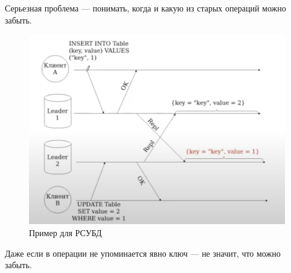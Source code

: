     \begin{definition}
      Серьезная проблема --- понимать, когда и какую из старых операций можно забыть.
    \end{definition}
    \begin{example}
      \begin{figure}[h]
          \centering
          \includegraphics[scale = 0.5]{../assets/14.png}
          \caption{Пример для РСУБД}
      \end{figure}
      Даже если в операции не упоминается явно ключ --- не значит, что можно забыть.\\
    \end{example}
